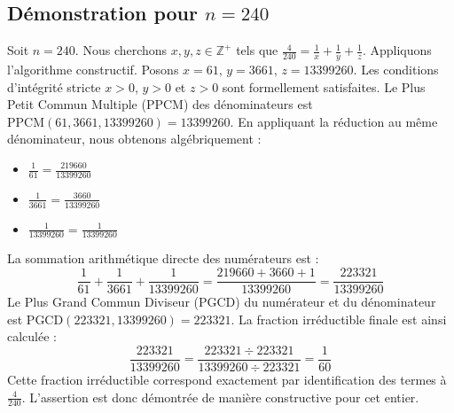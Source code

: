 \documentclass[11pt,a4paper]{article}
\begin{document}
\subsection{Démonstration pour $n = 240$}
Soit $n = 240$. Nous cherchons $x, y, z \in \mathbb{Z}^{+}$ tels que $\frac{4}{240} = \frac{1}{x} + \frac{1}{y} + \frac{1}{z}$.
Appliquons l'algorithme constructif. Posons $x = 61$, $y = 3661$, $z = 13399260$.
Les conditions d'intégrité stricte $x > 0$, $y > 0$ et $z > 0$ sont formellement satisfaites.
Le Plus Petit Commun Multiple (PPCM) des dénominateurs est $\text{PPCM}(61, 3661, 13399260) = 13399260$.
En appliquant la réduction au même dénominateur, nous obtenons algébriquement :
\begin{itemize}
    \item $\frac{1}{61} = \frac{219660}{13399260}$
    \item $\frac{1}{3661} = \frac{3660}{13399260}$
    \item $\frac{1}{13399260} = \frac{1}{13399260}$
\end{itemize}
La sommation arithmétique directe des numérateurs est :
$$ \frac{1}{61} + \frac{1}{3661} + \frac{1}{13399260} = \frac{219660 + 3660 + 1}{13399260} = \frac{223321}{13399260} $$
Le Plus Grand Commun Diviseur (PGCD) du numérateur et du dénominateur est $\text{PGCD}(223321, 13399260) = 223321$.
La fraction irréductible finale est ainsi calculée :
$$ \frac{223321}{13399260} = \frac{223321 \div 223321}{13399260 \div 223321} = \frac{1}{60} $$
Cette fraction irréductible correspond exactement par identification des termes à $\frac{4}{240}$. L'assertion est donc démontrée de manière constructive pour cet entier.
\end{document}
